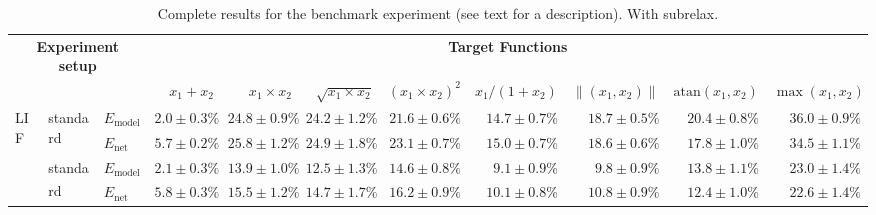 
\begin{sidewaystable}
	\caption[Complete results for the benchmark experiment]{Complete results for the benchmark experiment (see text for a description). \textsuperscript{\dag}With \gls{subrelax}.}
	\label{tbl:function_approximations_complete}
	\centering
	\sffamily
	\scriptsize
	\begin{tabular}{p{2.2cm} p{1.7cm} l r r r r r r r r }
	\toprule
	\multicolumn{3}{c}{\textbf{Experiment setup}} & \multicolumn{8}{c}{{\textbf{Target Functions}}}\\
	\cmidrule(r){1-3}\cmidrule(l){4-11}
	& & & $x_1 + x_2$ & $x_1 \times x_2$ & $\sqrt{x_1 \times x_2}$ & $(x_1 \times x_2) ^ 2$ & $x_1 / (1 + x_2)$ & $\|(x_1, x_2)\|$ & $\mathrm{atan}(x_1, x_2)$ & $\max(x_1, x_2)$\\
	\midrule
	\multirow{8}{2.2cm}{\raggedleft %
	LIF} &
	\multirow{2}{1.7cm}{\raggedleft standard} &
	$E_\mathrm{model}$ & 
	\color{Gray}$2.0 \pm 0.3\%$ & \color{Gray}$24.8 \pm 0.9\%$ & \color{Gray}$24.2 \pm 1.2\%$ & \color{Gray}$21.6 \pm 0.6\%$ & \color{Gray}$14.7 \pm 0.7\%$ & \color{Gray}$18.7 \pm 0.5\%$ & \color{Gray}$20.4 \pm 0.8\%$ & \color{Gray}$36.0 \pm 0.9\%$
	\\
	& & 
	$E_\mathrm{net}$ &
	\cellcolor{White!75!SteelBlue}$5.7 \pm 0.2\%$ & \cellcolor{White!7!SteelBlue}$25.8 \pm 1.2\%$ & \cellcolor{White!7!SteelBlue}$24.9 \pm 1.8\%$ & \cellcolor{White!7!SteelBlue}$23.1 \pm 0.7\%$ & \cellcolor{White!13!SteelBlue}$15.0 \pm 0.7\%$ & \cellcolor{White!7!SteelBlue}$18.6 \pm 0.6\%$ & \cellcolor{White!7!SteelBlue}$17.8 \pm 1.0\%$ & \cellcolor{White!7!SteelBlue}$34.5 \pm 1.1\%$
	\\\cmidrule(l){2-11}
	&
	\multirow{2}{1.7cm}{\raggedleft standard\textsuperscript{\dag}} &
	$E_\mathrm{model}$ & 
	\color{Gray}$2.1 \pm 0.3\%$ & \color{Gray}$13.9 \pm 1.0\%$ & \color{Gray}$12.5 \pm 1.3\%$ & \color{Gray}$14.6 \pm 0.8\%$ & \color{Gray}$9.1 \pm 0.9\%$ & \color{Gray}$9.8 \pm 0.9\%$ & \color{Gray}$13.8 \pm 1.1\%$ & \color{Gray}$23.0 \pm 1.4\%$
	\\
	& & 
	$E_\mathrm{net}$ &
	\cellcolor{White!69!SteelBlue}$5.8 \pm 0.3\%$ & \cellcolor{White!13!SteelBlue}$15.5 \pm 1.2\%$ & \cellcolor{White!13!SteelBlue}$14.7 \pm 1.7\%$ & \cellcolor{White!19!SteelBlue}$16.2 \pm 0.9\%$ & \cellcolor{White!50!SteelBlue}$10.1 \pm 0.8\%$ & \cellcolor{White!38!SteelBlue}$10.8 \pm 0.9\%$ & \cellcolor{White!25!SteelBlue}$12.4 \pm 1.0\%$ & \cellcolor{White!19!SteelBlue}$22.6 \pm 1.4\%$

\end{tabular}
\end{sidewaystable}
